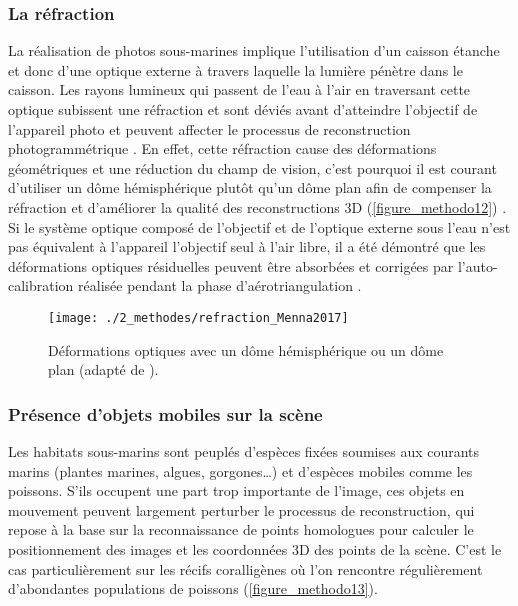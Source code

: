\subsubsection{La réfraction}

La réalisation de photos sous-marines implique l’utilisation d’un caisson étanche et donc d’une optique externe à travers laquelle la lumière pénètre dans le caisson. Les rayons lumineux qui passent de l’eau à l’air en traversant cette optique subissent une réfraction et sont déviés avant d’atteindre l’objectif de l’appareil photo et peuvent affecter le processus de reconstruction photogrammétrique \citep{telem_photogrammetric_2010}. En effet, cette réfraction cause des déformations \\géométriques et une réduction du champ de vision, c’est pourquoi il est courant d’utiliser un dôme hémisphérique plutôt qu’un dôme plan afin de compenser la réfraction et d’améliorer la qualité des reconstructions 3D (\autoref{figure_methodo12}) \citep{menna_optical_2017}. Si le système optique composé de l’objectif et de l’optique externe sous l’eau n’est pas équivalent à l’appareil l’objectif seul à l’air libre, il a été démontré que les déformations optiques résiduelles peuvent être absorbées et corrigées par l’auto-calibration réalisée pendant la phase d’aérotriangulation \citep{shortis_calibration_2015}.

\begin{figure}[H]
	\begin{center}
	\texttt{[image: ./2\_methodes/refraction\_Menna2017]}
		\caption[Déformations optiques avec un dôme hémisphérique ou un dôme plan]{Déformations optiques avec un dôme hémisphérique ou un dôme plan (adapté de \citet{menna_optical_2017}).}
	\label{figure_methodo12}
\end{center}
\end{figure}

\subsubsection{Présence d’objets mobiles sur la scène}

Les habitats sous-marins sont peuplés d’espèces fixées soumises aux courants marins (plantes marines, algues, gorgones…) et d’espèces mobiles comme les poissons. S’ils occupent une part trop importante de l’image, ces objets en mouvement peuvent largement perturber le processus de reconstruction, qui repose à la base sur la reconnaissance de points homologues pour calculer le positionnement des images et les coordonnées 3D des points de la scène. C’est le cas particulièrement sur les récifs coralligènes où l’on rencontre régulièrement d’abondantes populations de poissons (\autoref{figure_methodo13}).

